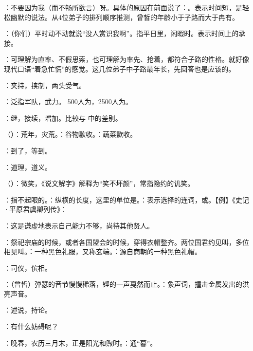 {
\item {}：不要因为我（而不畅所欲言）呀。具体的原因在前面说了：。表示时间短，是轻松幽默的说法。从4位弟子的排列顺序推测，曾皙的年龄小于子路而大于冉有。
\item {}：（你们）平时动不动就说“没人赏识我啊”。指平日里，闲暇时。表示时间上的承接。
\item {}：可理解为直率、不假思索，也可理解为率先、抢着，都符合子路的性格。就好像现代口语“着急忙慌”的感觉。这几位弟子中子路最年长，先回答也是应该的。%
\item {}：夹持，挟制，两头受气。
\item {}：泛指军队，武力。 500人为，2500人为。
\item {}：继，接续，增加。比较与  中的差别。
\item {}（）：荒年，灾荒。：谷物歉收。：蔬菜歉收。
\item {}：到了，等到。
\item {}：道理，道义。
\item {}（）：微笑，《说文解字》解释为“笑不坏颜”，常指隐约的讥笑。
\item {}：指不起眼的。：纵横的长度，这里的单位是。：表示选择的连词，或。【例】《史记·平原君虞卿列传》：
\item {}：这是谦虚地表示自己能力不够，尚待其他贤人。
\item {}：祭祀宗庙的时候，或者各国盟会的时候，穿得衣帽整齐。两位国君约见叫，多位相见叫。：一种黑色礼服，又称玄端。：源自商朝的一种黑色礼帽。
\item {}：司仪，傧相。
\item {}：（曾皙）弹瑟的音节慢慢稀落，铿的一声戛然而止。：象声词，撞击金属发出的洪亮声音。
\item {}：述说，持论。
\item {}：有什么妨碍呢？
\item {}：晚春，农历三月末，正是阳光和煦时。：通“暮”。

}
